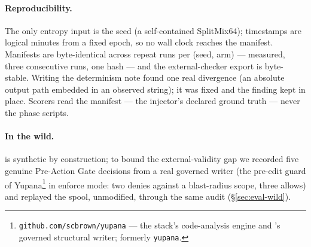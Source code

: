 \paragraph{Reproducibility.}
The only entropy input is the seed (a self-contained SplitMix64);
timestamps are logical minutes from a fixed epoch, so no wall clock
reaches the manifest. Manifests are byte-identical across repeat runs
per (seed, arm) --- measured, three consecutive runs, one hash --- and the
external-checker export is byte-stable. Writing the determinism note
found one real divergence (an absolute output path embedded in an
observed string); it was fixed and the finding kept in place. Scorers
read the manifest --- the injector's declared ground truth --- never the
phase scripts.

\paragraph{In the wild.}
\census is synthetic by construction; to bound the external-validity
gap we recorded five genuine Pre-Action Gate decisions from a real
governed writer (the pre-edit guard of Yupana\footnote{\texttt{github.com/scbrown/yupana} --- the stack's
code-analysis engine and \sys's governed structural writer; formerly
\texttt{yupana}.} in enforce mode: two denies
against a blast-radius scope, three allows) and replayed the spool,
unmodified, through the same audit (\S\ref{sec:eval-wild}).
